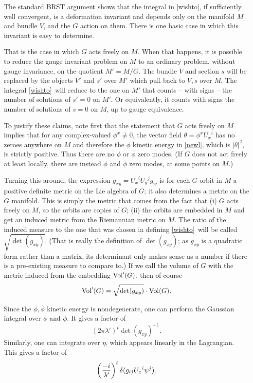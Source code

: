 \documentclass[12pt]{article}
\numberwithin{equation}{section}
\def\bar{\overline}
\begin{document}
The standard BRST argument shows that
the integral in \eqref{wishto}, if sufficiently
well convergent, is a deformation invariant and depends only on the manifold
$M$ and bundle $V$, and the $G$ action on them.
There is one basic case in which this invariant is easy to determine.

That is the case
in which $G$ acts freely on $M$.
When that happens, it is possible to reduce the gauge invariant problem
on $M$ to an ordinary problem, without gauge invariance, on the quotient
$M'=M/G$.  The bundle $V$ and section $s$ will be replaced by the objects
$V'$ and $s'$ over $M'$ which pull back to $V,s$ over $M$.  The
integral \eqref{wishto}\ will reduce to the one on $M'$ that counts
-- with signs -- the number of solutions
of $s'=0$ on $M'$.  Or equivalently, it counts with signs
the number of solutions
of $s=0$ on $M$, up to gauge equivalence.

To justify these claims, note first that the statement that $G$ acts
freely on $M$  implies
that for any complex-valued $\phi^x\not= 0$,
the vector field $\theta=\phi^xU_x{}^i$ has no zeroes anywhere on $M$
and therefore the $\phi$ kinetic energy in \eqref{newl}, which is
$|\theta|^2$, is strictly positive.  Thus there are no $\phi$ or
$\bar\phi$
zero modes.
(If $G$ does not act freely at least locally,
  there are instead $\phi$ and $\bar \phi$ zero modes, at some points on
$M$.)

Turning this around, the expression $g_{xy}=U_x{}^iU_y{}^j
g_{ij}$ is for each $G$ orbit in $M$ a positive definite metric on the Lie
algebra of $G$; it also determines a metric on the $G$ manifold.
This is simply the metric that comes from the fact
that (i) $G$ acts freely on $M$, so the orbits are copies of $G$;
(ii) the orbits are embedded in $M$ and get an induced metric from
the Riemannian metric on $M$.
The ratio
of the induced measure to the one that was chosen in defining
\eqref{wishto}\ will
be called $\sqrt{\det(g_{xy})}$.  (That is really the definition of
  $\det(g_{xy})$; as $g_{xy}$ is a quadratic form rather than a matrix,
  its determinant only makes sense as a number if there is a pre-existing
measure to compare to.)
If we call the volume of $G$ with
the metric induced from the embedding ${\rm Vol}'(G)$, then of course
\begin{equation}
  \label{nishto}
  {\rm Vol}'(G)=\sqrt{\det(g_{xy})}\cdot {\rm Vol}(G).
\end{equation}

Since the $\phi,\bar\phi$ kinetic energy is nondegenerate,
one can perform the Gaussian integral over $\phi$ and $\bar\phi$.
It gives a factor of
\begin{equation}
  \label{funnyfac}
  (2\pi\lambda')^{t}\det(g_{xy})^{-1}.
\end{equation}
Similarly, one can integrate over $\eta$, which appears linearly in the
Lagrangian.  This gives a factor
of
\begin{equation}
  \label{fivefac}
  \left({-i\over\lambda'}\right)^t\delta(g_{ij}U_x{}^i\psi^j).
\end{equation}
\end{document}
